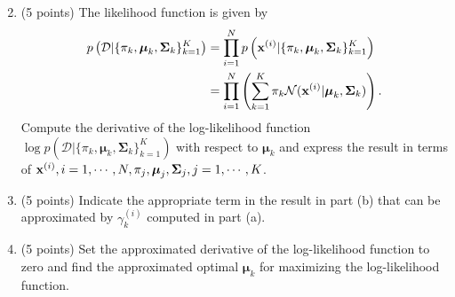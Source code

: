 \documentclass[12pt,a4paper]{article}
\renewcommand{\v}[1]{\ifmmode\mathbf{#1}\fi}
\renewcommand{\l}{\left}
\renewcommand{\r}{\right}
\newcommand{\SUM}[2]{\sum\limits_{#1}^{#2}}
\newcommand{\PROD}[2]{\prod\limits_{#1}^{#2}}
\begin{document}
\begin{enumerate}[label=(\alph*)]
	\setcounter{enumi}{1}
	\item (5 points)
	The likelihood function is given by
	\begin{align*}
		p\l( \mathcal D \vert \{ \pi_k , \boldsymbol\mu_k, \boldsymbol\Sigma_k\}_{k=1}^K \r) 
		& = \PROD{i=1}N p\l( \v x^{(i)} \vert \{ \pi_k , \boldsymbol\mu_k, \boldsymbol\Sigma_k\}_{k=1}^K \r)  \\
		& = \PROD{i=1}N  \l(\SUM{k=1}K \pi_k \mathcal N(\v x^{(i)} \vert \boldsymbol\mu_k, \boldsymbol\Sigma_k) \r).
	\end{align*}
	Compute the derivative of the log-likelihood function $\log p\l( \mathcal D \vert \{ \pi_k , \boldsymbol\mu_k, \boldsymbol\Sigma_k\}_{k=1}^K \r) $ with respect to $\boldsymbol\mu_k$ and express the result in terms of $\v x^{(i)}, i = 1, \cdots, N, \pi_j, \boldsymbol\mu_j, \boldsymbol\Sigma_j, j = 1, \cdots, K$. 
	\item (5 points)
	Indicate the appropriate term in the result in part (b) that can be approximated by $\gamma^{(i)}_k$ computed in part (a).
	\item (5 points)
	Set the approximated derivative of the log-likelihood function to zero and find the approximated optimal $\boldsymbol\mu_k$ for maximizing the log-likelihood function.

\end{enumerate}





\newpage
\end{document}
